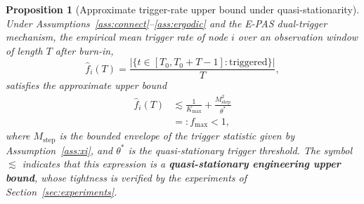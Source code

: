 \documentclass[10pt]{article}
\newtheorem{proposition}[theorem]{Proposition}
\newcommand{\EPAS}{E-PAS}
\newcommand{\fmax}{f_{\max}}
\newcommand{\Mstep}{M_{\text{step}}}
\begin{document}
\begin{proposition}[Approximate trigger-rate upper bound under quasi-stationarity]\label{thm:trigger}
  Under Assumptions~\ref{ass:connect}--\ref{ass:ergodic} and the \EPAS{} dual-trigger mechanism, the empirical mean trigger rate of node $i$ over an observation window of length $T$ after burn-in,
  \[
    \hat{f}_i(T)=\frac{|\{t\in[T_0,T_0+T-1]:\text{triggered}\}|}{T},
  \]
  satisfies the approximate upper bound
  \begin{equation}\label{eq:fmax}
    \begin{aligned}
      \hat{f}_i(T)
      &\lesssim \frac{1}{K_{\max}} + \frac{\Mstep^2}{\theta^*}\\
      &=: \fmax < 1,
    \end{aligned}
  \end{equation}
  where $\Mstep$ is the bounded envelope of the trigger statistic given by Assumption~\ref{ass:xi}, and $\theta^*$ is the quasi-stationary trigger threshold. The symbol $\lesssim$ indicates that this expression is a \textbf{quasi-stationary engineering upper bound}, whose tightness is verified by the experiments of Section~\ref{sec:experiments}.
\end{proposition}
\end{document}
